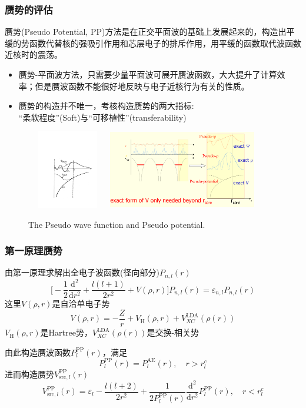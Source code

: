 \frame
{
\frametitle{赝势的评估}
赝势(\textrm{Pseudo Potential, PP})方法是在正交平面波的基础上发展起来的，构造出平缓的势函数代替核的强吸引作用和芯层电子的排斥作用，用平缓的函数取代波函数近核时的震荡。
\begin{itemize}
\setlength{\itemsep}{5pt}
	\item 赝势-平面波方法，只需要少量平面波可展开赝波函数，大大提升了计算效率；但是赝波函数不能很好地反映与电子近核行为有关的性质。
	\item 赝势的构造并不唯一，考核构造赝势的两大指标:~\\“柔软程度”\textrm{(Soft)}与“可移植性”\textrm{(transferability)}
\end{itemize}
\begin{figure}[h!]
\centering
\vspace*{-0.10in}
\includegraphics[height=1.35in,width=1.40in,viewport=154 100 562 508,clip]{Figures/Pseudo.pdf}
\includegraphics[height=1.35in,width=2.55in,viewport=1 1 980 500,clip]{Figures/Pseudo-2.png}
\caption{\tiny \textrm{The Pseudo wave function and Pseudo potential.}}%
\label{Pseudo_Potential-Wave}
\end{figure}
}

\frame
{
	\frametitle{第一原理赝势}
		由第一原理求解出全电子波函数(径向部分)$P_{n,l}(r)$
			\begin{displaymath}
				\bigg[-\dfrac12\dfrac{\mathrm{d}^2}{\mathrm{d}r^2}+\dfrac{l(l+1)}{2r^2}+V(\rho,r)\bigg]P_{n,l}(r)=\varepsilon_{n,l}P_{n,l}(r)
			\end{displaymath}
			这里$V(\rho,r)$是自洽单电子势
			$$V(\rho,r)=-\frac{Z}r+V_{\mathrm H}(\rho,r)+V_{XC}^{\mathrm{LDA}}(\rho(r))$$
			$V_{\mathrm H}(\rho,r)$是\textrm{Hartree}势，$V_{XC}^{\mathrm{LDA}}(\rho(r))$是交换-相关势

			由此构造赝波函数$P_l^{\mathrm{PP}}(r)$，满足
			$$P_l^{\mathrm{PP}}(r)=P_l^{\mathrm{AE}}(r),\quad r>r_{l}^c$$
			进而构造赝势$V_{\mathrm{src},l}^{\mathrm{PP}}(r)$
			$$V_{\mathrm{src},l}^{\mathrm{PP}}(r)=\varepsilon_l-\dfrac{l(l+2)}{2r^2}+\dfrac{1}{2P_l^{\mathrm{PP}}(r)}\dfrac{\mathrm{d}^2}{\mathrm{d}r^2}P_l^{\mathrm{PP}}(r),\quad r<r_{l}^c$$
}

